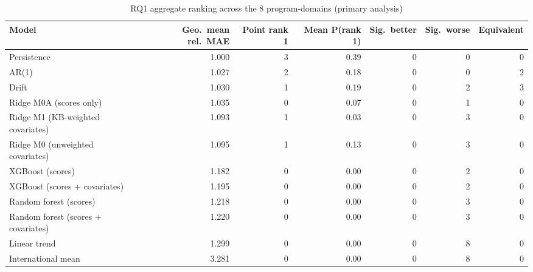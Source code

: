 \begin{table}[htbp]
\centering
\footnotesize
\caption{RQ1 aggregate ranking across the 8 program-domains (primary analysis)}
\label{tab:A1}
\begin{tabular}{lrrrrrr}
\toprule
Model & Geo.\ mean rel.\ MAE & Point rank 1 & Mean P(rank 1) & Sig.\ better & Sig.\ worse & Equivalent \\
\midrule
Persistence & 1.000 & 3 & 0.39 & 0 & 0 & 0 \\
AR(1) & 1.027 & 2 & 0.18 & 0 & 0 & 2 \\
Drift & 1.030 & 1 & 0.19 & 0 & 2 & 3 \\
Ridge M0A (scores only) & 1.035 & 0 & 0.07 & 0 & 1 & 0 \\
Ridge M1 (KB-weighted covariates) & 1.093 & 1 & 0.03 & 0 & 3 & 0 \\
Ridge M0 (unweighted covariates) & 1.095 & 1 & 0.13 & 0 & 3 & 0 \\
XGBoost (scores) & 1.182 & 0 & 0.00 & 0 & 2 & 0 \\
XGBoost (scores + covariates) & 1.195 & 0 & 0.00 & 0 & 2 & 0 \\
Random forest (scores) & 1.218 & 0 & 0.00 & 0 & 3 & 0 \\
Random forest (scores + covariates) & 1.220 & 0 & 0.00 & 0 & 3 & 0 \\
Linear trend & 1.299 & 0 & 0.00 & 0 & 8 & 0 \\
International mean & 3.281 & 0 & 0.00 & 0 & 8 & 0 \\
\bottomrule
\end{tabular}
\par{}
\end{table}
